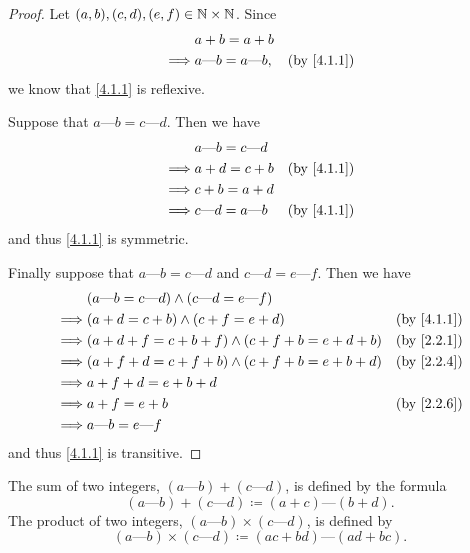 \begin{proof}
  Let \((a, b), (c, d), (e, f) \in \mathbb{N} \times \mathbb{N}\).
  Since
  \begin{align*}
             & a + b = a + b                                               \\
    \implies & a \text{---} b = a \text{---} b, & \text{(by \cref{4.1.1})}
  \end{align*}
  we know that \cref{4.1.1} is reflexive.

  Suppose that \(a \text{---} b = c \text{---} d\).
  Then we have
  \begin{align*}
             & a \text{---} b = c \text{---} d                            \\
    \implies & a + d = c + b                   & \text{(by \cref{4.1.1})} \\
    \implies & c + b = a + d                                              \\
    \implies & c \text{---} d = a \text{---} b & \text{(by \cref{4.1.1})}
  \end{align*}
  and thus \cref{4.1.1} is symmetric.

  Finally suppose that \(a \text{---} b = c \text{---} d\) and \(c \text{---} d = e \text{---} f\).
  Then we have
  \begin{align*}
             & (a \text{---} b = c \text{---} d) \land (c \text{---} d = e \text{---} f)                            \\
    \implies & (a + d = c + b) \land (c + f = e + d)                                     & \text{(by \cref{4.1.1})} \\
    \implies & (a + d + f = c + b + f) \land (c + f + b = e + d + b)                     & \text{(by \cref{2.2.1})} \\
    \implies & (a + f + d = c + f + b) \land (c + f + b = e + b + d)                     & \text{(by \cref{2.2.4})} \\
    \implies & a + f + d = e + b + d                                                                                \\
    \implies & a + f = e + b                                                             & \text{(by \cref{2.2.6})} \\
    \implies & a \text{---} b = e \text{---} f
  \end{align*}
  and thus \cref{4.1.1} is transitive.
\end{proof}

\begin{defn}\label{4.1.2}
  The sum of two integers, \((a \text{---} b) + (c \text{---} d)\), is defined by the formula
  \[
    (a \text{---} b) + (c \text{---} d) \coloneqq (a + c) \text{---} (b + d).
  \]
  The product of two integers, \((a \text{---} b) \times (c \text{---} d)\), is defined by
  \[
    (a \text{---} b) \times (c \text{---} d) \coloneqq (ac + bd) \text{---} (ad + bc).
  \]
\end{defn}

